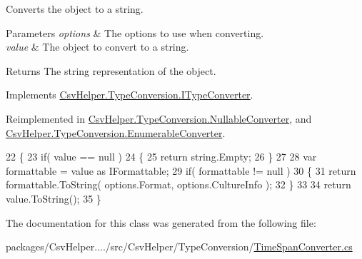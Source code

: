 Converts the object to a string. 


\begin{DoxyParams}{Parameters}
{\em options} & The options to use when converting.\\
\hline
{\em value} & The object to convert to a string.\\
\hline
\end{DoxyParams}
\begin{DoxyReturn}{Returns}
The string representation of the object.
\end{DoxyReturn}


Implements \hyperlink{a00097_a90c465c63dbcf913f38aa878f35e77c7}{Csv\-Helper.\-Type\-Conversion.\-I\-Type\-Converter}.



Reimplemented in \hyperlink{a00114_a7205cdb61d2d119582958232b3e63109}{Csv\-Helper.\-Type\-Conversion.\-Nullable\-Converter}, and \hyperlink{a00076_a7e07e9532857d748654d37db590a0e11}{Csv\-Helper.\-Type\-Conversion.\-Enumerable\-Converter}.


\begin{DoxyCode}
22         \{
23             \textcolor{keywordflow}{if}( value == null )
24             \{
25                 \textcolor{keywordflow}{return} string.Empty;
26             \}
27 
28             var formattable = value as IFormattable;
29             \textcolor{keywordflow}{if}( formattable != null )
30             \{
31                 \textcolor{keywordflow}{return} formattable.ToString( options.Format, options.CultureInfo );
32             \}
33 
34             \textcolor{keywordflow}{return} value.ToString();
35         \}
\end{DoxyCode}


The documentation for this class was generated from the following file\-:\begin{DoxyCompactItemize}
\item 
packages/\-Csv\-Helper..../src/\-Csv\-Helper/\-Type\-Conversion/\hyperlink{a00240}{Time\-Span\-Converter.\-cs}\end{DoxyCompactItemize}
